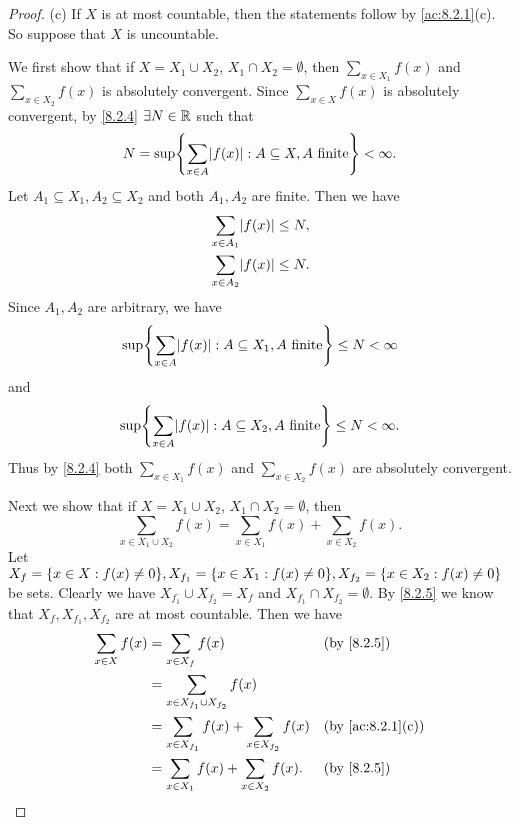 \begin{proof}{(c)}
	If \(X\) is at most countable, then the statements follow by \cref{ac:8.2.1}(c).
	So suppose that \(X\) is uncountable.

	We first show that if \(X = X_1 \cup X_2\), \(X_1 \cap X_2 = \emptyset\), then \(\sum_{x \in X_1} f(x)\) and \(\sum_{x \in X_2} f(x)\) is absolutely convergent.
	Since \(\sum_{x \in X} f(x)\) is absolutely convergent, by \cref{8.2.4} \(\exists N \in \mathbb{R}\) such that
	\[
		N = \sup\set{\sum_{x \in A} \abs{f(x)} : A \subseteq X, A \text{ finite}} < \infty.
	\]
	Let \(A_1 \subseteq X_1, A_2 \subseteq X_2\) and both \(A_1, A_2\) are finite.
	Then we have
	\begin{align*}
		 & \sum_{x \in A_1} \abs{f(x)} \leq N, \\
		 & \sum_{x \in A_2} \abs{f(x)} \leq N.
	\end{align*}
	Since \(A_1, A_2\) are arbitrary, we have
	\[
		\sup\set{\sum_{x \in A} \abs{f(x)} : A \subseteq X_1, A \text{ finite}} \leq N < \infty
	\]
	and
	\[
		\sup\set{\sum_{x \in A} \abs{f(x)} : A \subseteq X_2, A \text{ finite}} \leq N < \infty.
	\]
	Thus by \cref{8.2.4} both \(\sum_{x \in X_1} f(x)\) and \(\sum_{x \in X_2} f(x)\) are absolutely convergent.

	Next we show that if \(X = X_1 \cup X_2\), \(X_1 \cap X_2 = \emptyset\), then
	\[
		\sum_{x \in X_1 \cup X_2} f(x) = \sum_{x \in X_1} f(x) + \sum_{x \in X_2} f(x).
	\]
	Let \(X_f = \set{x \in X : f(x) \neq 0}, X_{f_1} = \set{x \in X_1 : f(x) \neq 0}, X_{f_2} = \set{x \in X_2 : f(x) \neq 0}\) be sets.
	Clearly we have \(X_{f_1} \cup X_{f_2} = X_f\) and \(X_{f_1} \cap X_{f_2} = \emptyset\).
	By \cref{8.2.5} we know that \(X_f, X_{f_1}, X_{f_2}\) are at most countable.
	Then we have
	\begin{align*}
		\sum_{x \in X} f(x) & = \sum_{x \in X_f} f(x)                                 &  & \by{8.2.5}                     \\
		                    & = \sum_{x \in X_{f_1} \cup X_{f_2}} f(x)                                                    \\
		                    & = \sum_{x \in X_{f_1}} f(x) + \sum_{x \in X_{f_2}} f(x) &  & \text{(by \cref{ac:8.2.1}(c))} \\
		                    & = \sum_{x \in X_1} f(x) + \sum_{x \in X_2} f(x).        &  & \by{8.2.5}
	\end{align*}


\end{proof}
